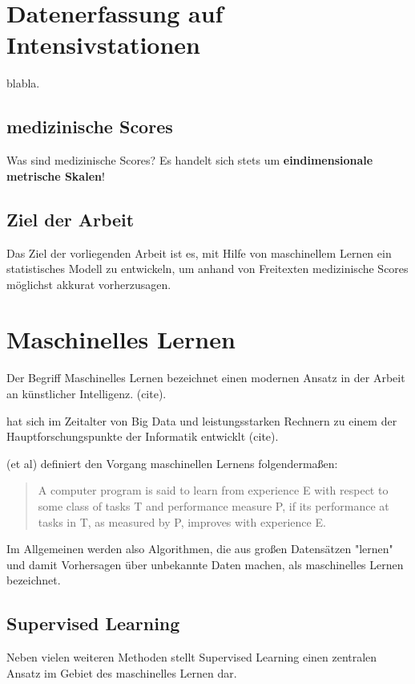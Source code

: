 \section{Datenerfassung auf Intensivstationen}

blabla. 

\subsection{medizinische Scores}
Was sind medizinische Scores? Es handelt sich stets um \textbf{eindimensionale metrische Skalen}!

\subsection{Ziel der Arbeit}

Das Ziel der vorliegenden Arbeit ist es, mit Hilfe von maschinellem Lernen ein statistisches Modell zu entwickeln, um anhand von Freitexten medizinische Scores möglichst akkurat vorherzusagen.

\section{Maschinelles Lernen}

Der Begriff Maschinelles Lernen bezeichnet einen modernen Ansatz in der Arbeit an künstlicher Intelligenz. (cite).

hat sich im Zeitalter von Big Data und leistungsstarken Rechnern zu einem der Hauptforschungspunkte der Informatik entwicklt (cite). 

(et al) definiert den Vorgang maschinellen Lernens folgendermaßen:

\begin{quote}
    {\foreignlanguage{english}{A computer program is said to learn from experience E with respect to some class of tasks T and performance measure P, if its performance at tasks in T, as measured by P, improves with experience E.}}
\end{quote}

Im Allgemeinen werden also Algorithmen, die aus großen Datensätzen "lernen" und damit Vorhersagen über unbekannte Daten machen, als maschinelles Lernen bezeichnet.

\subsection{Supervised Learning}

Neben vielen weiteren Methoden stellt Supervised Learning einen zentralen Ansatz im Gebiet des maschinelles Lernen dar.


